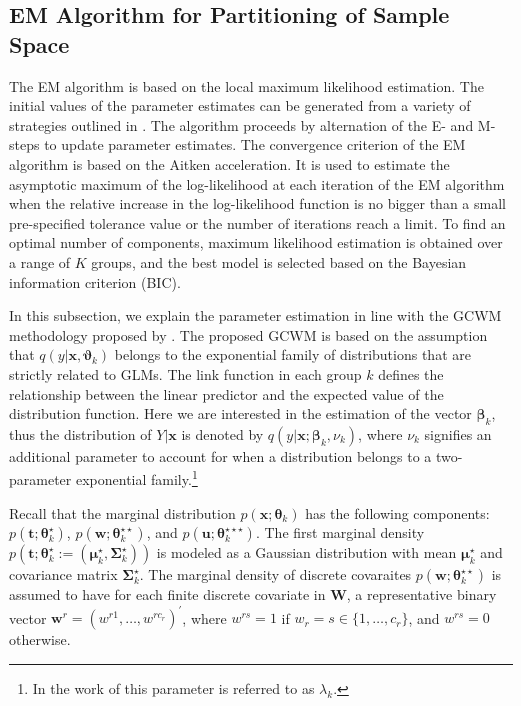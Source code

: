 \documentclass[12pt,letterpaper]{article}
\numberwithin{equation}{section}
\numberwithin{equation}{section}
\numberwithin{equation}{section}
\newcommand{\xTilda}{\tilde{\bm{x}}}
\begin{document}
\subsection{EM Algorithm for Partitioning of Sample Space}

The EM algorithm is based on the local  maximum likelihood estimation. %
The initial values of the parameter estimates can be generated from a variety of strategies outlined in \cite{initialPaperGrassiaRef}. %
 The algorithm proceeds by alternation of the E- and M-steps to update parameter estimates. %
%
The convergence criterion of the EM algorithm is based on the Aitken acceleration. It is used to estimate the asymptotic maximum of the log-likelihood at each iteration of the EM algorithm when the relative increase in the log-likelihood function is no bigger than a small pre-specified tolerance value or the number of iterations reach a limit. %
To find an optimal number of components, maximum likelihood estimation is obtained over a range of $K$ groups, and the best model is selected based on the Bayesian information criterion (BIC).   %

In this subsection, we explain the parameter estimation in line with the GCWM methodology proposed by \cite{Ingrassia+Punzo+Vittadini+Minotti:2015}. The proposed GCWM  is based on the assumption that $q(y|\bm{x},\bm{\vartheta}_k)$ belongs to the exponential family of distributions that are strictly related to GLMs. The link function in each group $k$ defines the relationship between the linear predictor and the expected value of the distribution function.   %
Here we are interested in the estimation of the vector $\bm {\beta}_k$, thus the distribution of $Y|\bm{x}$ is denoted by $q(y|\bm{x}; \bm{\beta}_k, \nu_k)$, where $\nu_k$ signifies an additional parameter to account for when a distribution belongs to a two-parameter exponential family.\footnote{In the work of \cite{Ingrassia+Punzo+Vittadini+Minotti:2015} this parameter is referred to as $\lambda_k$.} 

Recall that the marginal distribution $p(\bm{x}; \bm \theta_k)$ has the following components: $p(\bm{t}; \bm \theta_k^{\star})$, $p(\bm{w}; \bm \theta_k^{\star\star})$, and $p(\bm{u};\bm \theta_{k}^{\star\star\star})$. The first marginal density  $p(\bm{t}; \bm \theta_k^{\star}:=( \bm {\mu}_k^{\star}, \bm{\Sigma}_k^{\star}) )$ is modeled as a  Gaussian distribution with mean $\bm {\mu}_k^{\star}$ and covariance matrix $\bm{\Sigma}_k^{\star}$. 
 The marginal density of discrete covaraites $p(\bm{w};\bm{\theta}_{k}^{\star\star})$ is assumed to have for each finite discrete covariate in $\bm{W}$, a representative binary vector $\bm{w}^r=(w^{r1},\ldots,w^{rc_r})^{'}$, where $w^{rs}=1$ if $w_r = s\in\{1, \ldots, c_r\}$, %
and $w^{rs}=0$ otherwise.
\end{document}
